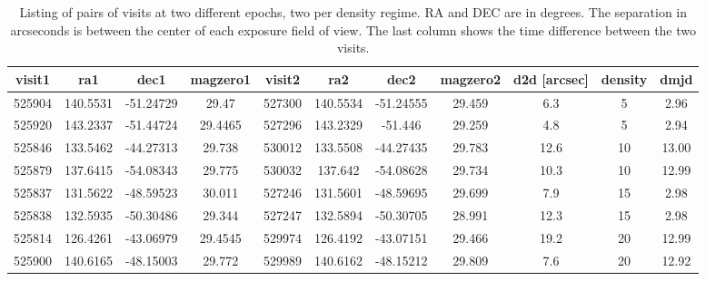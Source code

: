 \documentclass[DM,lsstdraft,toc,usenatbib]{lsstdoc}
\begin{document}
\begin{table}
\centering
\caption{Listing of pairs of visits at two different epochs, two per density regime. RA and DEC are in degrees. The separation in arcseconds is between the center of each exposure field of view. The last column shows the time difference between the two visits.}
\label{tab:epoch12_selection}
\begin{tabular}{ccccccccccc}
\hline
visit1 & ra1 & dec1 & magzero1 & visit2 & ra2 & dec2 & magzero2 & d2d [arcsec] & density & dmjd \\
\hline
525904 & 140.5531 & -51.24729 & 29.47 & 527300 & 140.5534 & -51.24555 & 29.459 & 6.3 & 5 & 2.96 \\
525920 & 143.2337 & -51.44724 & 29.4465 & 527296 & 143.2329 & -51.446 & 29.259 & 4.8 & 5 & 2.94 \\
525846 & 133.5462 & -44.27313 & 29.738 & 530012 & 133.5508 & -44.27435 & 29.783 & 12.6 & 10 & 13.00 \\
525879 & 137.6415 & -54.08343 & 29.775 & 530032 & 137.642 & -54.08628 & 29.734 & 10.3 & 10 & 12.99 \\
525837 & 131.5622 & -48.59523 & 30.011 & 527246 & 131.5601 & -48.59695 & 29.699 & 7.9 & 15 & 2.98 \\
525838 & 132.5935 & -50.30486 & 29.344 & 527247 & 132.5894 & -50.30705 & 28.991 & 12.3 & 15 & 2.98\\
525814 & 126.4261 & -43.06979 & 29.4545 & 529974 & 126.4192 & -43.07151 & 29.466 & 19.2 & 20 & 12.99 \\
525900 & 140.6165 & -48.15003 & 29.772 & 529989 & 140.6162 & -48.15212 & 29.809 & 7.6 & 20 & 12.92 \\
\hline
\end{tabular}
\end{table}


\end{document}
